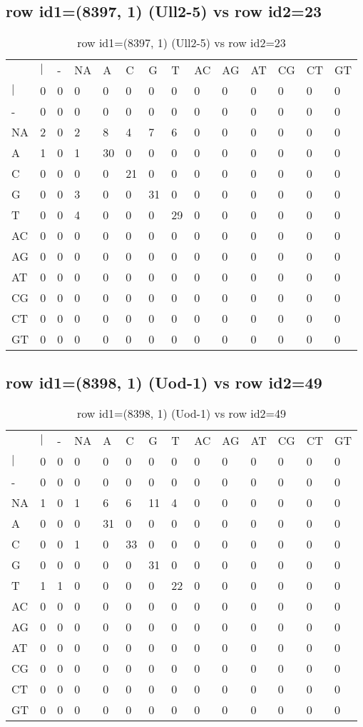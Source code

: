 \subsection{row id1=(8397, 1) (Ull2-5) vs row id2=23}
\begin{center}
\begin{longtable}{|l|l|l|l|l|l|l|l|l|l|l|l|l|l|}
\caption{row id1=(8397, 1) (Ull2-5) vs row id2=23} \label{table_dm656}\\
\hline
\\
\hline
&$|$&-&NA&A&C&G&T&AC&AG&AT&CG&CT&GT\\
$|$&0&0&0&0&0&0&0&0&0&0&0&0&0\\
-&0&0&0&0&0&0&0&0&0&0&0&0&0\\
NA&2&0&2&8&4&7&6&0&0&0&0&0&0\\
A&1&0&1&30&0&0&0&0&0&0&0&0&0\\
C&0&0&0&0&21&0&0&0&0&0&0&0&0\\
G&0&0&3&0&0&31&0&0&0&0&0&0&0\\
T&0&0&4&0&0&0&29&0&0&0&0&0&0\\
AC&0&0&0&0&0&0&0&0&0&0&0&0&0\\
AG&0&0&0&0&0&0&0&0&0&0&0&0&0\\
AT&0&0&0&0&0&0&0&0&0&0&0&0&0\\
CG&0&0&0&0&0&0&0&0&0&0&0&0&0\\
CT&0&0&0&0&0&0&0&0&0&0&0&0&0\\
GT&0&0&0&0&0&0&0&0&0&0&0&0&0\\
\hline
\end{longtable}
\end{center}

\subsection{row id1=(8398, 1) (Uod-1) vs row id2=49}
\begin{center}
\begin{longtable}{|l|l|l|l|l|l|l|l|l|l|l|l|l|l|}
\caption{row id1=(8398, 1) (Uod-1) vs row id2=49} \label{table_dm658}\\
\hline
\\
\hline
&$|$&-&NA&A&C&G&T&AC&AG&AT&CG&CT&GT\\
$|$&0&0&0&0&0&0&0&0&0&0&0&0&0\\
-&0&0&0&0&0&0&0&0&0&0&0&0&0\\
NA&1&0&1&6&6&11&4&0&0&0&0&0&0\\
A&0&0&0&31&0&0&0&0&0&0&0&0&0\\
C&0&0&1&0&33&0&0&0&0&0&0&0&0\\
G&0&0&0&0&0&31&0&0&0&0&0&0&0\\
T&1&1&0&0&0&0&22&0&0&0&0&0&0\\
AC&0&0&0&0&0&0&0&0&0&0&0&0&0\\
AG&0&0&0&0&0&0&0&0&0&0&0&0&0\\
AT&0&0&0&0&0&0&0&0&0&0&0&0&0\\
CG&0&0&0&0&0&0&0&0&0&0&0&0&0\\
CT&0&0&0&0&0&0&0&0&0&0&0&0&0\\
GT&0&0&0&0&0&0&0&0&0&0&0&0&0\\
\hline
\end{longtable}
\end{center}

